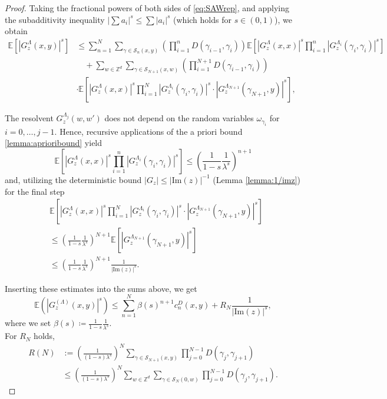 \documentclass[11pt, a4paper, UKenglish, oneside]{book}
\theoremstyle{plain}
\theoremstyle{remark}
\theoremstyle{definition}
\numberwithin{equation}{section}
\numberwithin{theorem}{section}
\begin{document}
\begin{proof}
Taking the fractional powers of both sides of \eqref{eq:SAWrep}, and applying the subadditivity inequality $\left| \sum a_i \right|^s \le \sum |a_i|^s$ (which holds for $s \in (0,1)$), we obtain
\begin{align}
    \mathbb{E}\left[ |G_z^\Lambda(x, y)|^s \right] &\le \sum_{n=1}^N \sum_{\gamma \in \mathcal{S}_n(x, y)} \left( \prod_{i=1}^n D(\gamma_{i-1}, \gamma_i) \right) \mathbb{E}\left[ |G_z^\Lambda(x, x)|^s \prod_{i=1}^n |G_z^{\Lambda_i}(\gamma_i, \gamma_i)|^s \right] \nonumber \\
    &\quad + \sum_{w \in \mathbb{Z}^d} \sum_{\gamma \in \mathcal{S}_{N+1}(x, w)} \left( \prod_{i=1}^{N+1} D(\gamma_{i-1}, \gamma_i) \right)\\
    &\cdot\mathbb{E}\left[ |G_z^{\Lambda}(x, x)|^s \prod_{i=1}^{N} |G_z^{\Lambda_i}(\gamma_i, \gamma_i)|^s \cdot |G_z^{\Lambda_{N+1}}(\gamma_{N+1}, y)|^s \right],
\end{align}

The resolvent $G_z^{\Lambda_j}(w, w')$ does not depend on the random variables $\omega_{\gamma_i}$ for $i = 0, \dots, j-1$. Hence, recursive applications of the a priori bound \ref{lemma:aprioribound} yield
\begin{equation*}
\mathbb{E}\left[ |G_z^\Lambda(x, x)|^s \prod_{i=1}^n |G_z^{\Lambda_i}(\gamma_i, \gamma_i)|^s \right] 
\le \left( \frac{1}{1-s} \frac{1}{\lambda^s} \right)^{n+1}
\end{equation*}
and, utilizing the deterministic bound $|G_z| \le |\mathrm{Im}(z)|^{-1}$ (Lemma \ref{lemma:1/imz}) for the final step
\begin{align*}
&\mathbb{E}\left[ |G_z^\Lambda(x, x)|^s \prod_{i=1}^{N} |G_z^{\Lambda_i}(\gamma_i, \gamma_i)|^s \cdot |G_z^{\Lambda_{N+1}}(\gamma_{N+1}, y)|^s \right] \\
&\le \left( \frac{1}{1-s} \frac{1}{\lambda^s} \right)^{N+1} \mathbb{E}\left[ |G_z^{\Lambda_{N+1}}(\gamma_{N+1}, y)|^s \right] \\
&\le \left( \frac{1}{1-s} \frac{1}{\lambda^s} \right)^{N+1} \frac{1}{|\mathrm{Im}(z)|^s}.
\end{align*}

Inserting these estimates into the sums above, we get
\begin{equation}
\mathbb{E}\left( |G_z^{(\Lambda)}(x,y)|^s \right) \le \sum_{n=1}^N \beta(s)^{n+1} c_n^D(x,y) + R_N \frac{1}{|\mathrm{Im}(z)|^s},\label{eq:semifinalboundSAW}
\end{equation}
where we set $\beta(s) \coloneqq \frac{1}{1-s} \frac{1}{\lambda^s}$. \\
For $R_N$ holds,
\begin{equation*}
\begin{split}
    R(N) &:= \left( \frac{1}{(1-s)\lambda^s} \right)^N \sum_{\gamma \in \mathcal{S}_{N+1}(x,y)} \prod_{j=0}^{N-1} D(\gamma_j, \gamma_{j+1}) \\
    &\le \left( \frac{1}{(1-s)\lambda^s} \right)^N \sum_{w \in \mathbb{Z}^d} \sum_{\gamma \in \mathcal{S}_N(0, w)} \prod_{j=0}^{N-1} D(\gamma_j, \gamma_{j+1}).
\end{split}
\end{equation*}


\end{proof}
\end{document}
